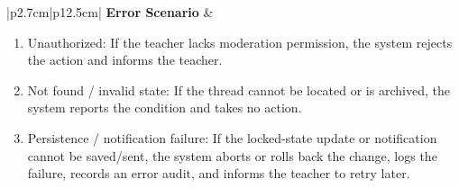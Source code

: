 \begin{table}[H]
\begin{tabular}{|p{2.7cm}|p{12.5cm}|}
        \textbf{Error Scenario} & \begin{minipage}[t]{\linewidth}
            \begin{enumerate}[topsep=0pt,itemsep=1pt,parsep=0pt,partopsep=0pt]
                \item Unauthorized: If the teacher lacks moderation permission, the system rejects the action and informs the teacher.
                \item Not found / invalid state: If the thread cannot be located or is archived, the system reports the condition and takes no action.
                \item Persistence / notification failure: If the locked-state update or notification cannot be saved/sent, the system aborts or rolls back the change, logs the failure, records an error audit, and informs the teacher to retry later.
            \end{enumerate}
        \end{minipage} \\ \hline
    \end{tabular}
    \label{tab:teacher-lock-unlock-thread}
\end{table}


